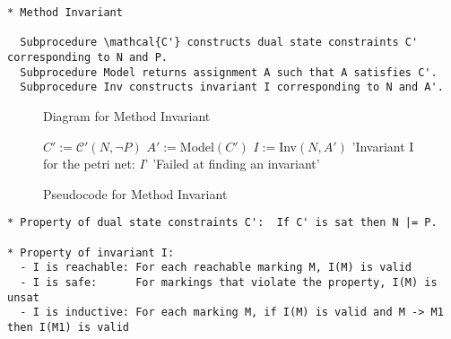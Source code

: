 \documentclass{llncs}
\begin{document}
\begin{verbatim}
* Method Invariant

  Subprocedure \mathcal{C'} constructs dual state constraints C' corresponding to N and P.
  Subprocedure Model returns assignment A such that A satisfies C'.
  Subprocedure Inv constructs invariant I corresponding to N and A'.
\end{verbatim}

\begin{figure}
\begin{center}
\end{center}
\caption{Diagram for Method Invariant}
\label{fig:method-invariant-diagram}
\end{figure}

\begin{figure}
\begin{algorithmic}[1]
\State $C' := \mathcal C'(N, \neg P)$
  \State $A' := $Model$(C')$
  \State $I := $Inv$(N, A')$
  \State \Return 'Invariant I for the petri net: $I$'
\Else
  \State \Return 'Failed at finding an invariant'
\EndIf
\end{algorithmic}
\caption{Pseudocode for Method Invariant}
\label{fig:method-invariant-pseudocode}
\end{figure}

\begin{verbatim}
* Property of dual state constraints C':  If C' is sat then N |= P.

* Property of invariant I:
  - I is reachable: For each reachable marking M, I(M) is valid
  - I is safe:      For markings that violate the property, I(M) is unsat
  - I is inductive: For each marking M, if I(M) is valid and M -> M1 then I(M1) is valid
\end{verbatim}
\end{document}
